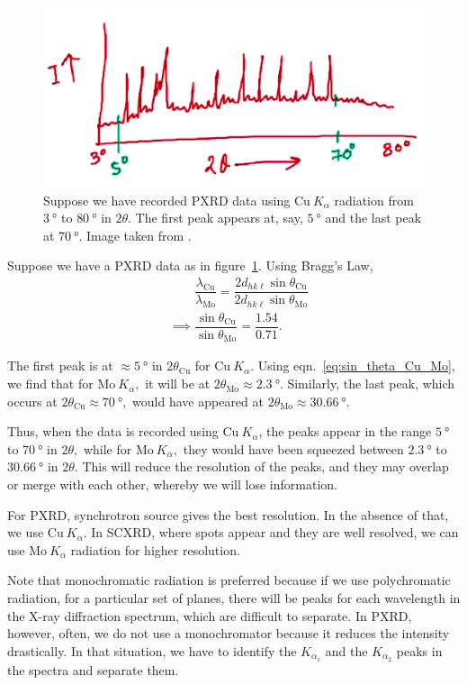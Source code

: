 \begin{figure}[h!]
	\centering
	\includegraphics[scale=0.8]{pxrd_peaks.png}
	\caption{\label{fig:pxrd_peaks}Suppose we have recorded PXRD data using $\mathrm{Cu}~K_\alpha$ radiation from $\SI{3}{\degree}$ to $\SI{80}{\degree}$ in $2\theta$. The first peak appears at, say, $\SI{5}{\degree}$ and the last peak at $\SI{70}{\degree}.$ Image taken from \cite[lecture 22]{Chowdhury2022}.}
\end{figure}

Suppose we have a PXRD data as in figure~\ref{fig:pxrd_peaks}. Using Bragg's Law,%
%
\begin{align}
&\phantom{\implies} \dfrac{\lambda_\mathrm{Cu}}{\lambda_\mathrm{Mo}} = \dfrac{2 d_{hk\ell} \sin \theta_\mathrm{Cu}}{2 d_{hk\ell} \sin \theta_\mathrm{Mo}} \nonumber \\[0.8em]
&\implies \dfrac{\sin \theta_\mathrm{Cu}}{\sin \theta_\mathrm{Mo}} = \dfrac{1.54}{0.71}. \label{eq:sin_theta_Cu_Mo}
\end{align}

The first peak is at $\approx \SI{5}{\degree}$ in $2\theta_\mathrm{Cu}$ for $\mathrm{Cu}~K_\alpha$. Using eqn.~\eqref{eq:sin_theta_Cu_Mo}, we find that for $\mathrm{Mo}~K_\alpha,$ it will be at $2\theta_\mathrm{Mo} \approx \SI{2.3}{\degree}.$ Similarly, the last peak, which occurs at $2\theta_\mathrm{Cu} \approx \SI{70}{\degree},$ would have appeared at $2\theta_\mathrm{Mo} \approx \SI{30.66}{\degree}.$

Thus, when the data is recorded using $\mathrm{Cu}~K_\alpha$, the peaks appear in the range $\SI{5}{\degree}$ to $\SI{70}{\degree}$ in $2\theta,$ while for $\mathrm{Mo}~K_\alpha,$ they would have been squeezed between $\SI{2.3}{\degree}$ to $\SI{30.66}{\degree}$ in $2\theta.$ This will reduce the resolution of the peaks, and they may overlap or merge with each other, whereby we will lose information.

For PXRD, synchrotron source gives the best resolution. In the absence of that, we use $\mathrm{Cu}~K_\alpha.$ In SCXRD, where spots appear and they are well resolved, we can use $\mathrm{Mo}~K_\alpha$ radiation for higher resolution.

Note that monochromatic radiation is preferred because if we use polychromatic radiation, for a particular set of planes, there will be peaks for each wavelength in the X-ray diffraction spectrum, which are difficult to separate. In PXRD, however, often, we do not use a monochromator because it reduces the intensity drastically. In that situation, we have to identify the $K_{\alpha_1}$ and the $K_{\alpha_2}$ peaks in the spectra and separate them.